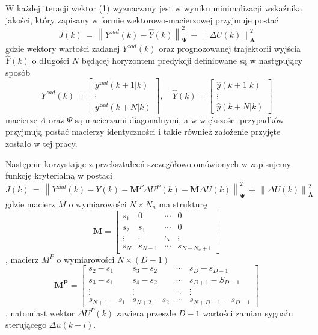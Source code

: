 \par W każdej iteracji wektor (1) wyznaczany jest w wyniku minimalizacji wskaźnika jakości, który zapisany w formie wektorowo-macierzowej przyjmuje postać
\begin{equation}
J(k) \, = \, \left\| Y^{zad}(k) - \hat{Y}(k) \right\|_{\bm{\Psi}}^2 \,+ \,\left\| \Delta U(k) \right\|_{\bm{\Lambda}}^2
\end{equation}
gdzie wektory wartości zadanej \( Y^{zad}(k) \) oraz prognozowanej trajektorii wyjścia \( \hat{Y}(k) \) o długości \( N \) będącej horyzontem predykcji definiowane są w następujący sposób
\begin{equation}
Y^{zad}(k) =
	 \begin{bmatrix}
		y^{zad}(k+1|k) \\
		\vdots \\
		y^{zad}(k+N|k)
	\end{bmatrix} , \quad
\hat{Y}(k) = 
	\begin{bmatrix}
		\hat{y}(k+1|k) \\
		\vdots \\
		\hat{y}(k+N|k)
	\end{bmatrix}
\end{equation}
macierze \( \Lambda\) oraz \( \Psi\) są macierzami diagonalnymi, a w większości przypadków przyjmują postać macierzy identyczności i takie również założenie przyjęte zostało w tej pracy. 
\par Następnie korzystając z przekształceń szczegółowo omówionych w \cite{stp2009} zapisujemy funkcję kryterialną w postaci
\begin{equation}
J(k) \, = \, \left\| Y^{zad}(k) - Y(k) - \bm{M}^P \Delta U^P(k) - \bm{M} \Delta U(k) \right\|_{\bm{\Psi}}^2 \,+ \,
\left\| \Delta U(k) \right\|_{\bm{\Lambda}}^2
\end{equation}
gdzie macierz \(M \) o wymiarowości \( N \times N_u \) ma strukturę
\begin{equation}
\bm{M} = 
	\begin{bmatrix}
		s_1 & 0 & \cdots & 0 \\
		s_2 & s_1 & \cdots & 0 \\
		\vdots & \vdots & \ddots & \vdots \\
		s_N & s_{N-1} & \cdots & s_{N-N_u+1}
	\end{bmatrix}
\end{equation}, 
macierz \(M^P \) o wymiarowości \( N \times (D-1) \) 
\begin{equation}
\bm{M^P} = 
	\begin{bmatrix}
		s_2 - s_1 & s_3 - s_2 & \cdots & s_D - s_{D-1} \\
		s_3 - s_1 & s_4 - s_2 & \cdots & s_{D+1} - S_{D-1}  \\
		\vdots & \vdots & \ddots & \vdots \\
		s_{N+1} - s_1 & s_{N+2} - s_2 & \cdots & s_{N+D-1} - s_{D-1}
	\end{bmatrix}
\end{equation}, 
natomiast wektor \( \Delta U^P(k) \) zawiera przeszłe \(D-1\) wartości zamian sygnału sterującego \(\Delta u(k-i)\). 

